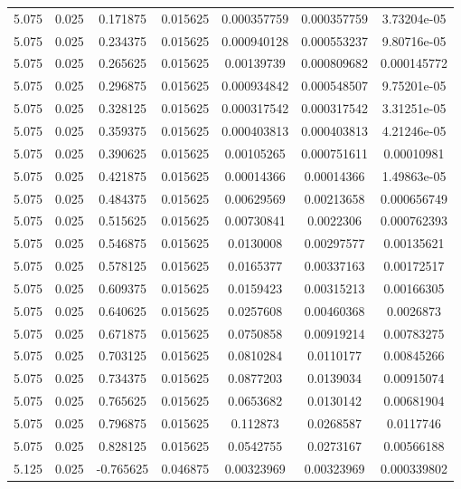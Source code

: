 \begin{table}[bh]
\begin{center}
{\begin{tabular}{ccccccc}
5.075	 & 0.025 & 	0.171875	 & 0.015625	 & 0.000357759	 & 0.000357759	 & 3.73204e-05 \\ 
5.075	 & 0.025 & 	0.234375	 & 0.015625	 & 0.000940128	 & 0.000553237	 & 9.80716e-05 \\ 
5.075	 & 0.025 & 	0.265625	 & 0.015625	 & 0.00139739	 & 0.000809682	 & 0.000145772 \\ 
5.075	 & 0.025 & 	0.296875	 & 0.015625	 & 0.000934842	 & 0.000548507	 & 9.75201e-05 \\ 
5.075	 & 0.025 & 	0.328125	 & 0.015625	 & 0.000317542	 & 0.000317542	 & 3.31251e-05 \\ 
5.075	 & 0.025 & 	0.359375	 & 0.015625	 & 0.000403813	 & 0.000403813	 & 4.21246e-05 \\ 
5.075	 & 0.025 & 	0.390625	 & 0.015625	 & 0.00105265	 & 0.000751611	 & 0.00010981 \\ 
5.075	 & 0.025 & 	0.421875	 & 0.015625	 & 0.00014366	 & 0.00014366	 & 1.49863e-05 \\ 
5.075	 & 0.025 & 	0.484375	 & 0.015625	 & 0.00629569	 & 0.00213658	 & 0.000656749 \\ 
5.075	 & 0.025 & 	0.515625	 & 0.015625	 & 0.00730841	 & 0.0022306	 & 0.000762393 \\ 
5.075	 & 0.025 & 	0.546875	 & 0.015625	 & 0.0130008	 & 0.00297577	 & 0.00135621 \\ 
5.075	 & 0.025 & 	0.578125	 & 0.015625	 & 0.0165377	 & 0.00337163	 & 0.00172517 \\ 
5.075	 & 0.025 & 	0.609375	 & 0.015625	 & 0.0159423	 & 0.00315213	 & 0.00166305 \\ 
5.075	 & 0.025 & 	0.640625	 & 0.015625	 & 0.0257608	 & 0.00460368	 & 0.0026873 \\ 
5.075	 & 0.025 & 	0.671875	 & 0.015625	 & 0.0750858	 & 0.00919214	 & 0.00783275 \\ 
5.075	 & 0.025 & 	0.703125	 & 0.015625	 & 0.0810284	 & 0.0110177	 & 0.00845266 \\ 
5.075	 & 0.025 & 	0.734375	 & 0.015625	 & 0.0877203	 & 0.0139034	 & 0.00915074 \\ 
5.075	 & 0.025 & 	0.765625	 & 0.015625	 & 0.0653682	 & 0.0130142	 & 0.00681904 \\ 
5.075	 & 0.025 & 	0.796875	 & 0.015625	 & 0.112873	 & 0.0268587	 & 0.0117746 \\ 
5.075	 & 0.025 & 	0.828125	 & 0.015625	 & 0.0542755	 & 0.0273167	 & 0.00566188 \\ 
5.125	 & 0.025 & 	-0.765625	 & 0.046875	 & 0.00323969	 & 0.00323969	 & 0.000339802 \\ 

\end{tabular}}
\end{center}
\end{table}
